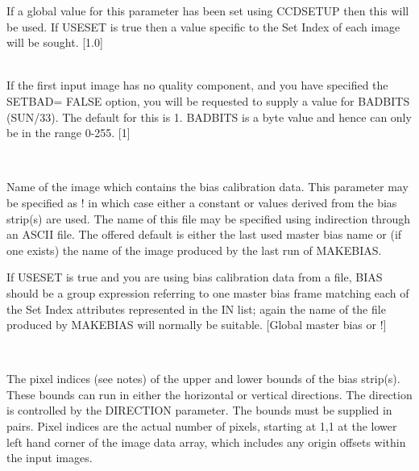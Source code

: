 \documentclass[twoside,11pt]{article}
\newcommand{\htmlref}[2]{#1}
\renewcommand{\_}{\texttt{\symbol{95}}}
\newcommand{\routine}[1]{{\sc #1}}
\newcommand{\xroutine}[1]{\htmlref{{\sc #1}}{#1}}
\newcommand{\sstsubsection}[1]{ \item[{#1}] \mbox{} \\}
\newcommand{\sstsubsection}[1]{\item[{#1}]}
\begin{document}
{{{         If a global value for this parameter has been set using
         \routine{CCDSETUP} then this will be used.  If USESET is true then a
         value specific to the Set Index of each image will be sought.
         [1.0]
      }
      \sstsubsection{
         BADBITS = \_INTEGER (Read)
      } {
         If the first input image has no quality component, and you have
         specified the SETBAD= FALSE option, you will be requested to
         supply a value for BADBITS (SUN/33).  The default for this
         is 1. BADBITS is a byte value and hence can only be in the
         range 0-255.
         [1]
      }
      \sstsubsection{
         BIAS = LITERAL (Read)
      } {
         Name of the image which contains the bias calibration data. This
         parameter may be specified as ! in which case either a
         constant or values derived from the bias strip(s) are used.
         The name of this file may be specified using indirection
         through an ASCII file. The offered default is either the last
         used master bias name or (if one exists) the name of the image
         produced by the last run of \xroutine{MAKEBIAS}.

         If USESET is true and you are using bias calibration data
         from a file, BIAS should be a group expression referring
         to one master bias frame matching each of the Set Index
         attributes represented in the IN list; again the name of
         the file produced by \xroutine{MAKEBIAS} will normally be suitable.
         [Global master bias or !]
      }
      \sstsubsection{
         BOUNDS( 2 or 4 ) = \_INTEGER (Read)
      } {
         The pixel indices (see notes) of the upper and lower bounds of
         the bias strip(s). These bounds can run in either the
         horizontal or vertical directions. The direction is controlled
         by the DIRECTION parameter. The bounds must be supplied in
         pairs. Pixel indices are the actual number of pixels, starting
         at 1,1 at the lower left hand corner of the image data array,
         which includes any origin offsets within the input images.

}}}
\end{document}

